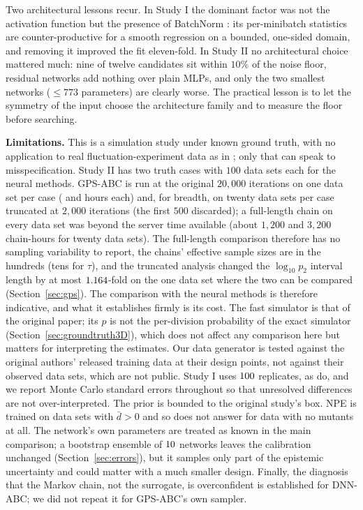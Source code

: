 \documentclass[sn-basic,iicol,pdflatex]{sn-jnl}
\begin{document}
Two architectural lessons recur. In Study I the dominant factor was not the activation function but the presence of
BatchNorm \citep{ioffe2015}: its per-minibatch statistics are counter-productive for a smooth regression on a bounded,
one-sided domain, and removing it improved the fit eleven-fold. In Study II no architectural choice mattered much: nine of
twelve candidates sit within $10\%$ of the noise floor, residual networks add nothing over plain MLPs, and only the two
smallest networks ($\le 773$ parameters) are clearly worse. The practical lesson is to let the symmetry of the input choose the
architecture family \citep{radev2022} and to measure the floor before searching.

\noindent\textbf{Limitations.} This is a simulation study under known ground truth, with no application to real
fluctuation-experiment data as in \citet{lu2023}; only that can speak to misspecification. Study II has two truth cases with
$100$ data sets each for the neural methods. GPS-ABC is run at the original $20{,}000$ iterations on one data set per case (\gtrCaseTwoHours{} and \gtrCaseOneHours{} hours each) and, for breadth, on twenty data sets per case truncated at $2{,}000$ iterations (the first $500$ discarded); a full-length chain on every data set was beyond the server time available (about $1{,}200$ and $3{,}200$ chain-hours for twenty data sets). The full-length comparison therefore has no sampling variability to report, the chains' effective sample sizes are in the hundreds (tens for $\tau$), and the truncated analysis changed the $\log_{10}p_2$ interval length by at most $1.164$-fold on the one data set where the two can be compared (Section~\ref{sec:gps}). The comparison with the neural methods is therefore indicative, and what it establishes firmly is its cost. The fast simulator is that of the original
paper; its $p$ is not the per-division probability of the exact simulator (Section~\ref{sec:groundtruth3D}), which does not affect any comparison here but
matters for interpreting the estimates. Our data generator is tested against the original authors' released training data at their
design points, not against their observed data sets, which are not public. Study I uses $100$ replicates, as
\citeauthor{lu2023} do, and we report Monte Carlo standard errors throughout so that unresolved differences are not
over-interpreted. The prior is bounded to the original study's box. NPE is trained on data sets with $\bar d>0$ and so does not
answer for data with no mutants at all. The network's own parameters are treated as known in the main comparison; a bootstrap ensemble of $10$ networks leaves the calibration unchanged (Section~\ref{sec:errors}), but it samples only part of the epistemic uncertainty and could matter with a much smaller design. Finally, the diagnosis that the Markov chain, not the surrogate, is overconfident is established for DNN-ABC; we did not repeat it for GPS-ABC's own sampler.
\end{document}
